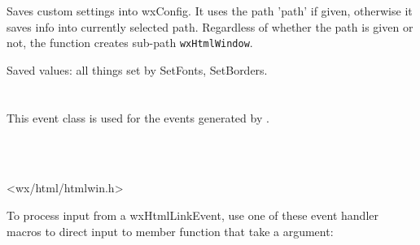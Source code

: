 Saves custom settings into wxConfig. It uses the path 'path'
if given, otherwise it saves info into currently selected path.
Regardless of whether the path is given or not, the function creates sub-path 
{\tt wxHtmlWindow}.

Saved values: all things set by SetFonts, SetBorders.










\section{}\label{wxhtmllinkevent}

This event class is used for the events generated by .


\\
\\


<wx/html/htmlwin.h>




To process input from a wxHtmlLinkEvent, use one of these event handler macros to
direct input to member function that take a  argument:

\twocolwidtha{7cm}
\begin{twocollist}
\end{twocollist}



\label{wxhtmllinkeventctor}


